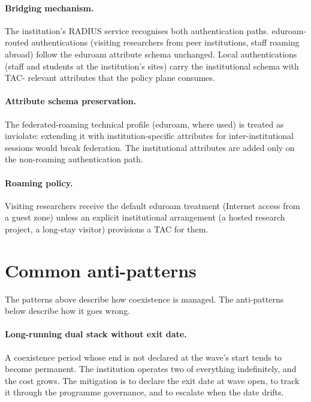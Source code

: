 \paragraph{Bridging mechanism.} The institution's RADIUS service
recognises both authentication paths. eduroam-routed
authentications (visiting researchers from peer institutions,
staff roaming abroad) follow the eduroam attribute schema
unchanged. Local authentications (staff and students at the
institution's sites) carry the institutional schema with TAC-
relevant attributes that the policy plane consumes.

\paragraph{Attribute schema preservation.} The federated-roaming
technical profile (eduroam, where used) is treated as inviolate:
extending it with institution-specific attributes for
inter-institutional sessions would break federation. The
institutional attributes are added only on the non-roaming
authentication path.

\paragraph{Roaming policy.} Visiting researchers receive the
default eduroam treatment (Internet access from a guest zone)
unless an explicit institutional arrangement (a hosted research
project, a long-stay visitor) provisions a TAC for them.

\section{Common anti-patterns}
\label{sec:cp-anti-patterns}

The patterns above describe how coexistence is managed. The
anti-patterns below describe how it goes wrong.

\paragraph{Long-running dual stack without exit date.} A coexistence
period whose end is not declared at the wave's start tends to
become permanent. The institution operates two of everything
indefinitely, and the cost grows. The mitigation is to declare the
exit date at wave open, to track it through the programme
governance, and to escalate when the date drifts.

